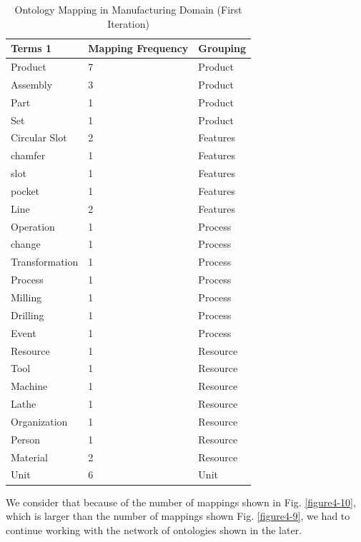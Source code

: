 \begin{table}[tp]%
	
	\caption{Ontology Mapping in Manufacturing Domain (First Iteration)}
	\label{table4.5}\centering
	\begin{tabular}{p{2.5cm} p{2cm} p{2.5cm}}\toprule
		
		Terms 1 &	Mapping Frequency	& Grouping \\\toprule
		Product	&7&	Product\\\toprule
		Assembly&	3&	Product\\\toprule
		Part&	1&	Product\\\toprule
		Set&	1&	Product\\\toprule
		Circular Slot&	2&	Features\\\toprule
		chamfer&	1&	Features\\\toprule
		slot&	1&	Features\\\toprule
		pocket&	1	&Features\\\toprule
		Line&	2&	Features\\\toprule
		Operation&	1&	Process\\\toprule
		change&	1&	Process\\\toprule
		Transformation&	1&	Process\\\toprule
		Process	&1&	Process\\\toprule
		Milling&	1&	Process\\\toprule
		Drilling&	1&	Process\\\toprule
		Event&	1&	Process\\\toprule
		Resource&	1&	Resource\\\toprule
		Tool&	1&	Resource\\\toprule
		Machine	&1&	Resource\\\toprule
		Lathe&	1&	Resource\\\toprule
		Organization&	1&	Resource\\\toprule
		Person&	1&	Resource\\\toprule
		Material&	2&	Resource\\\toprule
		Unit&	6&	Unit\\\toprule
		
		
	\end{tabular}
	
\end{table}



We consider that because of the number of mappings shown in Fig. \ref{figure4-10}, which is larger than the number of mappings shown Fig. \ref{figure4-9}, we had to continue working with the network of ontologies shown in the later. 

